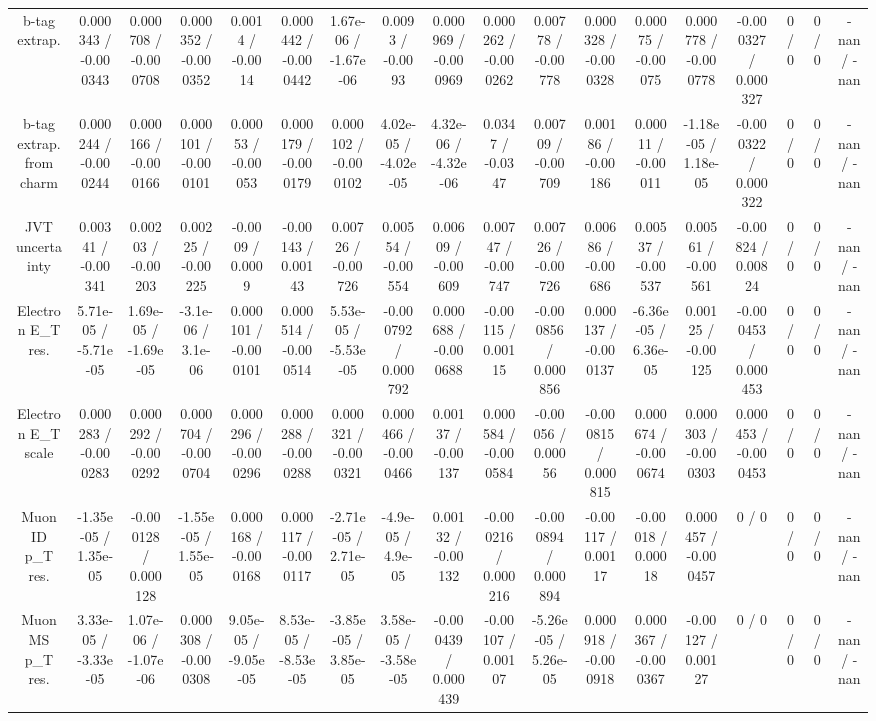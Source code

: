 \documentclass[10pt]{article}
\begin{document}
\begin{table}[htbp]
\begin{center}
\begin{tabular}{|c|c|c|c|c|c|c|c|c|c|c|c|c|c|c|c|c|c|}
  b-tag extrap. & 0.000343 / -0.000343 & 0.000708 / -0.000708 & 0.000352 / -0.000352 & 0.0014 / -0.0014 & 0.000442 / -0.000442 & 1.67e-06 / -1.67e-06 & 0.0093 / -0.0093 & 0.000969 / -0.000969 & 0.000262 / -0.000262 & 0.00778 / -0.00778 & 0.000328 / -0.000328 & 0.00075 / -0.00075 & 0.000778 / -0.000778 & -0.000327 / 0.000327 & 0 / 0 & 0 / 0 & -nan / -nan \\ 
  b-tag extrap. from charm & 0.000244 / -0.000244 & 0.000166 / -0.000166 & 0.000101 / -0.000101 & 0.00053 / -0.00053 & 0.000179 / -0.000179 & 0.000102 / -0.000102 & 4.02e-05 / -4.02e-05 & 4.32e-06 / -4.32e-06 & 0.0347 / -0.0347 & 0.00709 / -0.00709 & 0.00186 / -0.00186 & 0.00011 / -0.00011 & -1.18e-05 / 1.18e-05 & -0.000322 / 0.000322 & 0 / 0 & 0 / 0 & -nan / -nan \\ 
  JVT uncertainty & 0.00341 / -0.00341 & 0.00203 / -0.00203 & 0.00225 / -0.00225 & -0.0009 / 0.0009 & -0.00143 / 0.00143 & 0.00726 / -0.00726 & 0.00554 / -0.00554 & 0.00609 / -0.00609 & 0.00747 / -0.00747 & 0.00726 / -0.00726 & 0.00686 / -0.00686 & 0.00537 / -0.00537 & 0.00561 / -0.00561 & -0.00824 / 0.00824 & 0 / 0 & 0 / 0 & -nan / -nan \\ 
  Electron E_{T} res. & 5.71e-05 / -5.71e-05 & 1.69e-05 / -1.69e-05 & -3.1e-06 / 3.1e-06 & 0.000101 / -0.000101 & 0.000514 / -0.000514 & 5.53e-05 / -5.53e-05 & -0.000792 / 0.000792 & 0.000688 / -0.000688 & -0.00115 / 0.00115 & -0.000856 / 0.000856 & 0.000137 / -0.000137 & -6.36e-05 / 6.36e-05 & 0.00125 / -0.00125 & -0.000453 / 0.000453 & 0 / 0 & 0 / 0 & -nan / -nan \\ 
  Electron E_{T} scale & 0.000283 / -0.000283 & 0.000292 / -0.000292 & 0.000704 / -0.000704 & 0.000296 / -0.000296 & 0.000288 / -0.000288 & 0.000321 / -0.000321 & 0.000466 / -0.000466 & 0.00137 / -0.00137 & 0.000584 / -0.000584 & -0.00056 / 0.00056 & -0.000815 / 0.000815 & 0.000674 / -0.000674 & 0.000303 / -0.000303 & 0.000453 / -0.000453 & 0 / 0 & 0 / 0 & -nan / -nan \\ 
  Muon ID p_{T} res. & -1.35e-05 / 1.35e-05 & -0.000128 / 0.000128 & -1.55e-05 / 1.55e-05 & 0.000168 / -0.000168 & 0.000117 / -0.000117 & -2.71e-05 / 2.71e-05 & -4.9e-05 / 4.9e-05 & 0.00132 / -0.00132 & -0.000216 / 0.000216 & -0.000894 / 0.000894 & -0.00117 / 0.00117 & -0.00018 / 0.00018 & 0.000457 / -0.000457 & 0 / 0 & 0 / 0 & 0 / 0 & -nan / -nan \\ 
  Muon MS p_{T} res. & 3.33e-05 / -3.33e-05 & 1.07e-06 / -1.07e-06 & 0.000308 / -0.000308 & 9.05e-05 / -9.05e-05 & 8.53e-05 / -8.53e-05 & -3.85e-05 / 3.85e-05 & 3.58e-05 / -3.58e-05 & -0.000439 / 0.000439 & -0.00107 / 0.00107 & -5.26e-05 / 5.26e-05 & 0.000918 / -0.000918 & 0.000367 / -0.000367 & -0.00127 / 0.00127 & 0 / 0 & 0 / 0 & 0 / 0 & -nan / -nan \\ 

\end{tabular}
\end{center}
\end{table}
\end{document}
